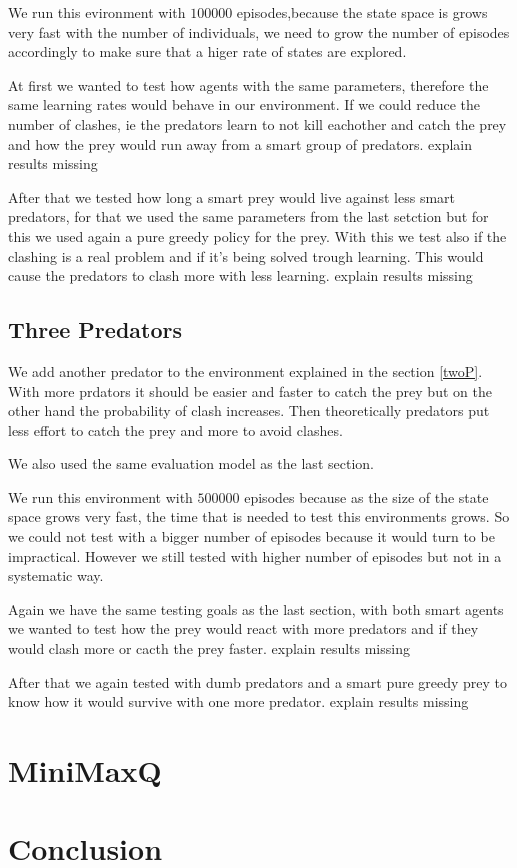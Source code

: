 \documentclass{article}
\begin{document}
We run this evironment with $100000$ episodes,because the state space is grows
very fast with the number of individuals, we need to grow the number of episodes
accordingly to make sure that a higer rate of states are explored.

At first we wanted to test how agents with the same parameters, therefore
the same learning rates would behave in our environment. If we could reduce the
number of clashes, ie the predators learn to not kill eachother and catch the
prey and how the prey would run away from a smart group of predators.
\error explain results missing

After that we tested how long a smart prey would live against less smart
predators, for that we used the same parameters from the last setction but for
this we used again a pure greedy policy for the prey.
With this we test also if the clashing is a real problem and if it's being solved
trough learning. This would cause the predators to clash more with less
learning. 
\error explain results missing


\subsection{Three Predators}
We add another predator to the environment explained in the section \ref{twoP}.
With more prdators it should be easier and faster to catch the prey but on the
other hand the probability of clash increases. Then theoretically predators put
less effort to catch the prey and more to avoid clashes.

We also used the same evaluation model as the last section.

We run this environment with $500000$ episodes because as the size of the state
space grows very fast, the time that is needed to test this environments grows.
So we could not test with a bigger number of episodes because it would turn to
be impractical. However we still tested with higher number of episodes but not
in a systematic way.

Again we have the same testing goals as the last section, with both smart agents
we wanted to test how the prey would react with more predators and if they would
clash more or cacth the prey faster.
\error explain results missing

After that we again tested with dumb predators and a smart pure greedy prey to
know how it would survive with one more predator.
\error explain results missing

\section{MiniMaxQ}

\section{Conclusion}
\end{document}
